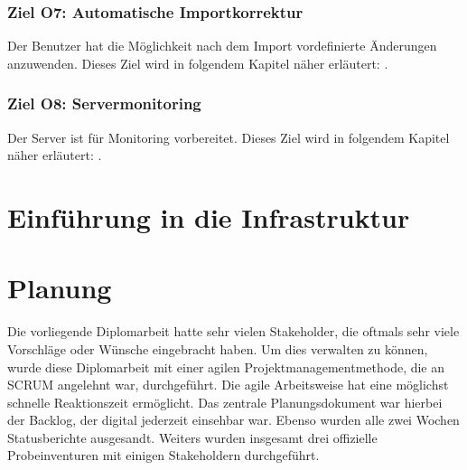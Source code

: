 \documentclass[
    headings=optiontotocandhead,%
    twoside,
    numbers=noenddot,%
    toc=flat, %
    12pt, %
    titlepage, %
    parskip=full, %
    listof=totoc, %
    listof=flat, %
    numbers=noenddot, %
    bibliography=totoc, %
    a4paper,DIV=14,
    BCOR=15mm,
]{scrbook}
\begin{document}
  \subsection*{Ziel O7: Automatische Importkorrektur}

  Der Benutzer hat die Möglichkeit nach dem Import vordefinierte Änderungen anzuwenden.
  Dieses Ziel wird in folgendem Kapitel näher erläutert: .




  \subsection*{Ziel O8: Servermonitoring}

  Der Server ist für Monitoring vorbereitet.
  Dieses Ziel wird in folgendem Kapitel näher erläutert: .



%







\chapter{Einführung in die Infrastruktur}




\renewcommand{\kapitelautor}{}

\chapter{Planung}

Die vorliegende Diplomarbeit hatte sehr vielen Stakeholder, die oftmals sehr viele Vorschläge oder Wünsche eingebracht haben. Um dies verwalten zu können, wurde diese Diplomarbeit mit einer agilen Projektmanagementmethode, die an SCRUM angelehnt war, durchgeführt. Die agile Arbeitsweise hat eine möglichst schnelle Reaktionszeit ermöglicht. Das zentrale Planungsdokument war hierbei der Backlog, der digital jederzeit einsehbar war. Ebenso wurden alle zwei Wochen Statusberichte ausgesandt. Weiters wurden insgesamt drei offizielle Probeinventuren mit einigen Stakeholdern durchgeführt.
\end{document}
